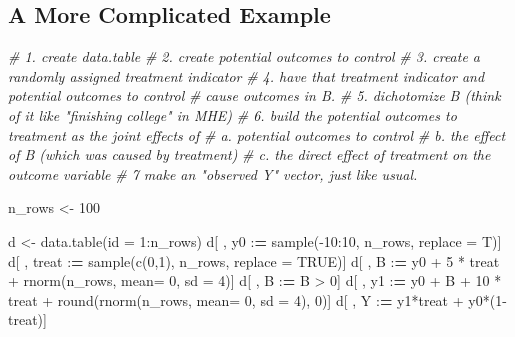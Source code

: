 \documentclass[
]{article}
\newenvironment{Shaded}{\begin{snugshade}}{\end{snugshade}}
\newcommand{\AttributeTok}[1]{\textcolor[rgb]{0.77,0.63,0.00}{#1}}
\newcommand{\CommentTok}[1]{\textcolor[rgb]{0.56,0.35,0.01}{\textit{#1}}}
\newcommand{\ConstantTok}[1]{\textcolor[rgb]{0.00,0.00,0.00}{#1}}
\newcommand{\DecValTok}[1]{\textcolor[rgb]{0.00,0.00,0.81}{#1}}
\newcommand{\ErrorTok}[1]{\textcolor[rgb]{0.64,0.00,0.00}{\textbf{#1}}}
\newcommand{\FunctionTok}[1]{\textcolor[rgb]{0.00,0.00,0.00}{#1}}
\newcommand{\NormalTok}[1]{#1}
\newcommand{\OtherTok}[1]{\textcolor[rgb]{0.56,0.35,0.01}{#1}}
\newcommand{\SpecialCharTok}[1]{\textcolor[rgb]{0.00,0.00,0.00}{#1}}
\begin{document}
\hypertarget{a-more-complicated-example}{%
\subsection{A More Complicated Example}\label{a-more-complicated-example}}

\begin{Shaded}
\begin{Highlighting}[]
\CommentTok{\# 1. create data.table}
\CommentTok{\# 2. create potential outcomes to control}
\CommentTok{\# 3. create a randomly assigned treatment indicator }
\CommentTok{\# 4. have that treatment indicator and potential outcomes to control }
\CommentTok{\#   cause outcomes in B. }
\CommentTok{\# 5. dichotomize B (think of it like "finishing college" in MHE)}
\CommentTok{\# 6. build the potential outcomes to treatment as the joint effects of }
\CommentTok{\#   a. potential outcomes to control}
\CommentTok{\#   b. the effect of B (which was caused by treatment)}
\CommentTok{\#   c. the direct effect of treatment on the outcome variable}
\CommentTok{\# 7 make an "observed Y" vector, just like usual. }

\NormalTok{n\_rows }\OtherTok{\textless{}{-}} \DecValTok{100}

\NormalTok{d }\OtherTok{\textless{}{-}} \FunctionTok{data.table}\NormalTok{(}\AttributeTok{id =} \DecValTok{1}\SpecialCharTok{:}\NormalTok{n\_rows)}
\NormalTok{d[ , y0    }\SpecialCharTok{:}\ErrorTok{=} \FunctionTok{sample}\NormalTok{(}\SpecialCharTok{{-}}\DecValTok{10}\SpecialCharTok{:}\DecValTok{10}\NormalTok{, n\_rows, }\AttributeTok{replace =}\NormalTok{ T)] }
\NormalTok{d[ , treat }\SpecialCharTok{:}\ErrorTok{=} \FunctionTok{sample}\NormalTok{(}\FunctionTok{c}\NormalTok{(}\DecValTok{0}\NormalTok{,}\DecValTok{1}\NormalTok{), n\_rows, }\AttributeTok{replace =} \ConstantTok{TRUE}\NormalTok{)]}
\NormalTok{d[ , B     }\SpecialCharTok{:}\ErrorTok{=}\NormalTok{ y0 }\SpecialCharTok{+} \DecValTok{5} \SpecialCharTok{*}\NormalTok{ treat }\SpecialCharTok{+} \FunctionTok{rnorm}\NormalTok{(n\_rows, }\AttributeTok{mean=} \DecValTok{0}\NormalTok{, }\AttributeTok{sd =} \DecValTok{4}\NormalTok{)]}
\NormalTok{d[ , B     }\SpecialCharTok{:}\ErrorTok{=}\NormalTok{ B }\SpecialCharTok{\textgreater{}} \DecValTok{0}\NormalTok{] }
\NormalTok{d[ , y1    }\SpecialCharTok{:}\ErrorTok{=}\NormalTok{ y0 }\SpecialCharTok{+}\NormalTok{ B }\SpecialCharTok{+} \DecValTok{10} \SpecialCharTok{*}\NormalTok{ treat }\SpecialCharTok{+} \FunctionTok{round}\NormalTok{(}\FunctionTok{rnorm}\NormalTok{(n\_rows, }\AttributeTok{mean=} \DecValTok{0}\NormalTok{, }\AttributeTok{sd =} \DecValTok{4}\NormalTok{), }\DecValTok{0}\NormalTok{)]}
\NormalTok{d[ , Y     }\SpecialCharTok{:}\ErrorTok{=}\NormalTok{ y1}\SpecialCharTok{*}\NormalTok{treat }\SpecialCharTok{+}\NormalTok{ y0}\SpecialCharTok{*}\NormalTok{(}\DecValTok{1}\SpecialCharTok{{-}}\NormalTok{treat)]}
\end{Highlighting}
\end{Shaded}
\end{document}
